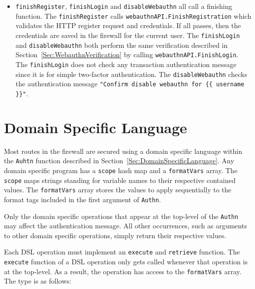 \begin{itemize}[nosep]
\item \lstinline{finishRegister}, \lstinline{finishLogin} and \lstinline{disableWebauthn} all call a finishing function. The \lstinline{finishRegister} calls \lstinline{webauthnAPI.FinishRegistration} which validates the HTTP register request and credentials. If all passes, then the credentials are saved in the firewall for the current user. The \lstinline{finishLogin} and \lstinline{disableWebauthn} both perform the same verification described in Section~\ref{Sec:WebauthnVerification} by calling \lstinline{webauthnAPI.FinishLogin}. The \lstinline{finishLogin} does not check any transaction authentication message since it is for simple two-factor authentication. The \lstinline{disableWebauthn} checks the authentication message \lstinline|"Confirm disable webauthn for {{ username }}"|.

\iffalse
first check if the user has webauthn enabled and then call \lstinline{webauthnAPI.BeginLogin}. Similarly as in Section~\ref{Sec:WebauthnVerification}, these Go library functions return session data to be saved locally at the firewall and a options data to be returned as a response to this request.
\fi

\end{itemize}

\section{Domain Specific Language}

Most routes in the firewall are secured using a domain specific language within the \lstinline{Auhtn} function described in Section~\ref{Sec:DomainSpecificLanguage}. Any domain specific program has a \lstinline{scope} hash map and a \lstinline{formatVars} array. The \lstinline{scope} maps strings standing for variable names to their respective contained values. The \lstinline{formatVars} array stores the values to apply sequentially to the format tags included in the first argument of \lstinline{Authn}.

Only the domain specific operations that appear at the top-level of the \lstinline{Authn} may affect the authentication message. All other occurrences, such as arguments to other domain specific operations, simply return their respective values.

Each DSL operation must implement an \lstinline{execute} and \lstinline{retrieve} function. The \lstinline{execute} function of a DSL operation only gets called whenever that operation is at the top-level. As a result, the operation has access to the \lstinline{formatVars} array. The type is as follows:

